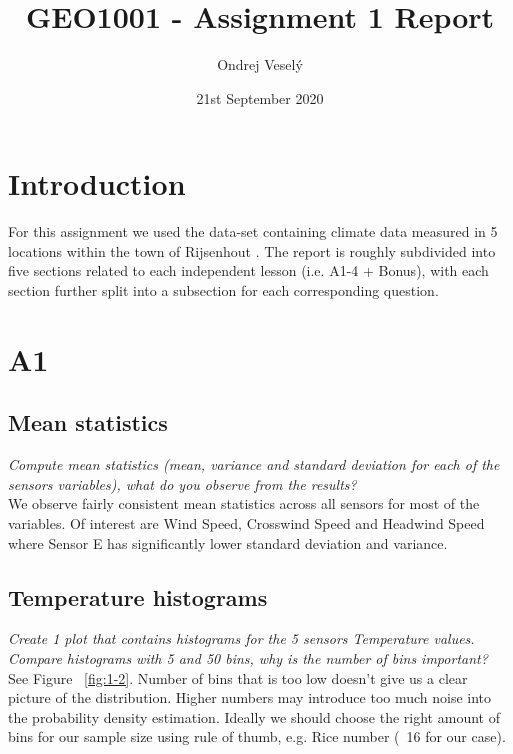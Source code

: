 \documentclass{article}
\title{GEO1001 - Assignment 1 Report}
\author{Ondrej Veselý}
\date{21st September 2020}
\begin{document}
\maketitle

\section*{Introduction}
For this assignment we used the data-set containing climate data measured in 5 locations within the town of Rijsenhout \citep{data}. The report is roughly subdivided into five sections related to each independent lesson (i.e. A1-4 + Bonus), with each section further split into a subsection for each corresponding question.


\newpage

\section{A1}

\subsection{Mean statistics}
\textit{
Compute mean statistics (mean, variance and standard deviation for each of the sensors variables), what do you observe from the results?
}\\

We observe fairly consistent mean statistics across all sensors for most of the variables. Of interest are Wind Speed, Crosswind Speed and Headwind Speed where Sensor E has significantly lower standard deviation and variance.

\subsection{Temperature histograms}
\textit{
Create 1 plot that contains histograms for the 5 sensors Temperature values. Compare histograms with 5 and 50 bins, why is the number of bins important?
}\\

See Figure ~\ref{fig:1-2}. Number of bins that is too low doesn't give us a clear picture of the distribution. Higher numbers may introduce too much noise into the probability density estimation. Ideally we should choose the right amount of bins for our sample size using rule of thumb, e.g. Rice number (~16 for our case).
\end{document}
